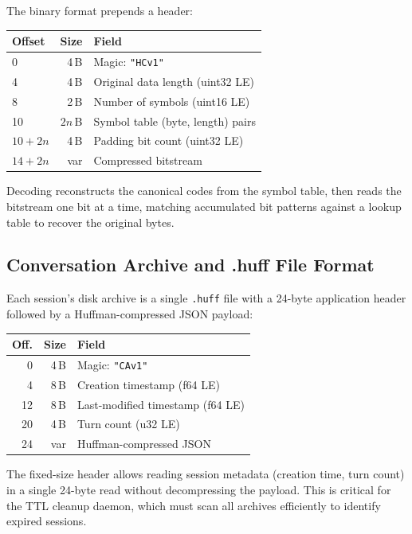 \documentclass[conference]{IEEEtran}
\begin{document}
The binary format prepends a header:

\begin{center}
\begin{tabular}{lrl}
\toprule
\textbf{Offset} & \textbf{Size} & \textbf{Field} \\
\midrule
0 & 4\,B & Magic: \texttt{"HCv1"} \\
4 & 4\,B & Original data length (uint32 LE) \\
8 & 2\,B & Number of symbols (uint16 LE) \\
10 & $2n$\,B & Symbol table (byte, length) pairs \\
$10{+}2n$ & 4\,B & Padding bit count (uint32 LE) \\
$14{+}2n$ & var & Compressed bitstream \\
\bottomrule
\end{tabular}
\end{center}

Decoding reconstructs the canonical codes from the symbol table, then reads the bitstream one bit at a time, matching accumulated bit patterns against a lookup table to recover the original bytes.

\subsection{Conversation Archive and .huff File Format}

Each session's disk archive is a single \texttt{.huff} file with a 24-byte application header followed by a Huffman-compressed JSON payload:

\begin{center}
{\scriptsize
\begin{tabular}{@{}rrl@{}}
\toprule
\textbf{Off.} & \textbf{Size} & \textbf{Field} \\
\midrule
0 & 4\,B & Magic: \texttt{"CAv1"} \\
4 & 8\,B & Creation timestamp (f64 LE) \\
12 & 8\,B & Last-modified timestamp (f64 LE) \\
20 & 4\,B & Turn count (u32 LE) \\
24 & var & Huffman-compressed JSON \\
\bottomrule
\end{tabular}}
\end{center}

The fixed-size header allows reading session metadata (creation time, turn count) in a single 24-byte read without decompressing the payload. This is critical for the TTL cleanup daemon, which must scan all archives efficiently to identify expired sessions.
\end{document}
